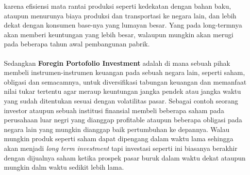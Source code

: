 \documentclass{article}
\begin{document}
karena efisiensi mata rantai produksi seperti kedekatan dengan bahan baku, 
ataupun menurunya biaya produksi dan transportasi ke negara lain, 
dan lebih dekat dengan konsumen base-nya yang lumayan besar. 
Yang pada long-termnya akan memberi keuntungan yang lebih besar,
walaupun mungkin akan merugi pada beberapa tahun awal pembangunan pabrik.\\
\\Sedangkan \textbf{Foregin Portofolio Investment} adalah di mana sebuah pihak 
membeli instrumen-instrumen keuangan pada sebuah negara lain, 
seperti saham, obligasi 
dan semacamnya, untuk diversifikasi tabungan keuangan dan memanfaat nilai tukar tertentu agar  meraup 
keuntungan jangka pendek atau jangka waktu yang sudah ditentukan sesuai 
dengan volatilitas pasar. Sebagai contoh 
seorang investor ataupun sebuah institusi finansial membeli beberapa saham pada perusahaan luar negri yang dianggap profitable ataupun beberapa obligasi pada negara lain yang mungkin dianggap baik pertumbuhan ke depannya. Walau mungkin produk seperti saham dapat dipengang dalam waktu lama sehingga akan menjadi \emph{long term investment} tapi investasi seperti ini biasanya berakhir dengan dijualnya saham ketika prospek pasar buruk dalam waktu dekat ataupun mungkin dalm waktu sedikit lebih lama.
\end{document}
